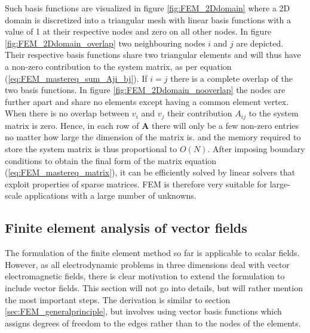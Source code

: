 Such basis functions are visualized in figure \ref{fig:FEM_2Ddomain} where a 2D domain is discretized into a triangular mesh with linear basis functions with a value of 1 at their respective nodes and zero on all other nodes. In figure \ref{fig:FEM_2Ddomain_overlap} two neighbouring nodes $i$ and $j$ are depicted. Their respective basis functions share two triangular elements and will thus have a non-zero contribution to the system matrix, as per equation (\ref{eq:FEM_mastereq_sum_Aji_bj}). If $i=j$ there is a complete overlap of the two basis functions. In figure \ref{fig:FEM_2Ddomain_nooverlap} the nodes are further apart and share no elements except having a common element vertex. When there is no overlap between $v_i$ and $v_j$ their contribution $A_{ij}$ to the system matrix is zero. Hence, in each row of $\mathbf{A}$ there will only be a few non-zero entries no matter how large the dimension of the matrix is. and the memory required to store the system matrix is thus proportional to $O(N)$\cite{FEM_TheoryAndCompOfEM_Jian-Ming_Jin}. After imposing boundary conditions to obtain the final form of the matrix equation (\ref{eq:FEM_mastereq_matrix}), it can be efficiently solved by linear solvers that exploit properties of sparse matrices\cite{FEM_TheoryAndCompOfEM_Jian-Ming_Jin}. FEM is therefore very suitable for large-scale applications with a large number of unknowns.

\subsection{Finite element analysis of vector fields}
The formulation of the finite element method so far is applicable to scalar fields. However, as all electrodynamic problems in three dimensions deal with vector electromagnetic fields, there is clear motivation to extend the formulation to include vector fields. This section will not go into details, but will rather mention the most important steps. The derivation is similar to section \ref{sec:FEM_generalprinciple}, but involves using vector basis functions which assigns degrees of freedom to the edges rather than to the nodes of the elements\cite{FEM_in_EM_jianming_jin}.%

